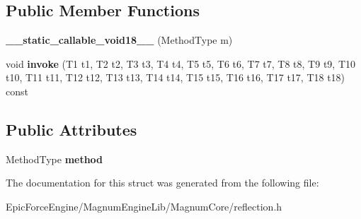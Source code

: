 \subsection*{Public Member Functions}
\begin{DoxyCompactItemize}
\item 
{\bfseries \+\_\+\+\_\+static\+\_\+callable\+\_\+void18\+\_\+\+\_\+} (Method\+Type m)\hypertarget{structagm_1_1reflection_1_1____static__callable__void18_____a1e7d3c047c4319b5ee543190c1116aa9}{}\label{structagm_1_1reflection_1_1____static__callable__void18_____a1e7d3c047c4319b5ee543190c1116aa9}

\item 
void {\bfseries invoke} (T1 t1, T2 t2, T3 t3, T4 t4, T5 t5, T6 t6, T7 t7, T8 t8, T9 t9, T10 t10, T11 t11, T12 t12, T13 t13, T14 t14, T15 t15, T16 t16, T17 t17, T18 t18) const \hypertarget{structagm_1_1reflection_1_1____static__callable__void18_____a92d5f8364af4cd515bde5c498ad5d79d}{}\label{structagm_1_1reflection_1_1____static__callable__void18_____a92d5f8364af4cd515bde5c498ad5d79d}

\end{DoxyCompactItemize}
\subsection*{Public Attributes}
\begin{DoxyCompactItemize}
\item 
Method\+Type {\bfseries method}\hypertarget{structagm_1_1reflection_1_1____static__callable__void18_____af2459cf7a03f7c2abbc357bcfe9441cf}{}\label{structagm_1_1reflection_1_1____static__callable__void18_____af2459cf7a03f7c2abbc357bcfe9441cf}

\end{DoxyCompactItemize}


The documentation for this struct was generated from the following file\+:\begin{DoxyCompactItemize}
\item 
Epic\+Force\+Engine/\+Magnum\+Engine\+Lib/\+Magnum\+Core/reflection.\+h\end{DoxyCompactItemize}
